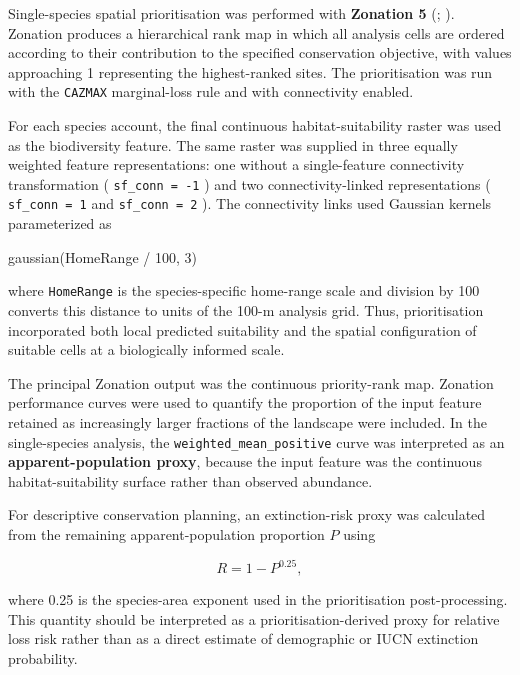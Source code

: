 \documentclass[
  openany]{book}
\newenvironment{Shaded}{\begin{snugshade}}{\end{snugshade}}
\newcommand{\NormalTok}[1]{#1}
\renewenvironment{Shaded}
    {\ignorespaces}
    {\unskip}%
\let\OldTexttt\texttt
\renewcommand{\texttt}[1]{%
  \OldTexttt{\small #1}%
}
\begin{document}
Single-species spatial prioritisation was performed with \textbf{Zonation 5} (; ). Zonation produces a hierarchical rank map in which all analysis cells are ordered according to their contribution to the specified conservation objective, with values approaching 1 representing the highest-ranked sites. The prioritisation was run with the \texttt{CAZMAX} marginal-loss rule and with connectivity enabled.

For each species account, the final continuous habitat-suitability raster was used as the biodiversity feature. The same raster was supplied in three equally weighted feature representations: one without a single-feature connectivity transformation (\texttt{sf\_conn\ =\ -1}) and two connectivity-linked representations (\texttt{sf\_conn\ =\ 1} and \texttt{sf\_conn\ =\ 2}). The connectivity links used Gaussian kernels parameterized as

\begin{Shaded}
\begin{Highlighting}[]
\NormalTok{gaussian(HomeRange / 100, 3)}
\end{Highlighting}
\end{Shaded}

where \texttt{HomeRange} is the species-specific home-range scale and division by 100 converts this distance to units of the 100-m analysis grid. Thus, prioritisation incorporated both local predicted suitability and the spatial configuration of suitable cells at a biologically informed scale.

The principal Zonation output was the continuous priority-rank map. Zonation performance curves were used to quantify the proportion of the input feature retained as increasingly larger fractions of the landscape were included. In the single-species analysis, the \texttt{weighted\_mean\_positive} curve was interpreted as an \textbf{apparent-population proxy}, because the input feature was the continuous habitat-suitability surface rather than observed abundance.

For descriptive conservation planning, an extinction-risk proxy was calculated from the remaining apparent-population proportion \(P\) using

\[
R = 1 - P^{0.25},
\]

where 0.25 is the species-area exponent used in the prioritisation post-processing. This quantity should be interpreted as a prioritisation-derived proxy for relative loss risk rather than as a direct estimate of demographic or IUCN extinction probability.
\end{document}
